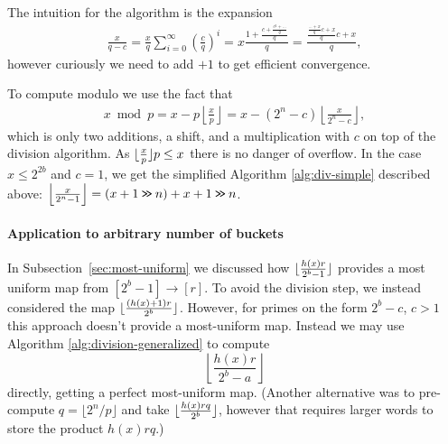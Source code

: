 The intuition for the algorithm is the expansion
\begin{align}
   \frac{x}{q-c}
   = \frac{x}{q}\sum_{i=0}^\infty \left(\frac{c}{q}\right)^i
   = x\frac{1+\frac{c+\frac{c^2 + \dots}{q}}{q}}{q}
   = \frac{\frac{\frac{\dots+x}{q}c+x}{q}c+x}{q},
\end{align}
however curiously we need to add $+1$ to get efficient convergence.









To compute modulo we use the fact that
\begin{align}
   x \bmod p
   = x - p\left\lfloor\frac{x}{p}\right\rfloor
   = x - (2^n - c)\left\lfloor\frac{x}{2^n-c}\right\rfloor,
\end{align}
which is only two additions, a shift, and a multiplication with $c$ on top of the division algorithm.
As $\lfloor {\frac{x}{p}} \rfloor p \le x$ there is no danger of overflow.
In the case $x\le 2^{2b}$ and $c=1$, we get the simplified Algorithm \ref{alg:div-simple} described above: $ \left\lfloor\frac{x}{2^n-1}\right\rfloor = (x+1 \mathbin{\texttt{>\!>}} n)+x+1 \mathbin{\texttt{>\!>}} n$.


\paragraph{Application to arbitrary number of buckets}
In Subsection~\ref{sec:most-uniform} we discussed how $\lfloor {\frac{h(x)r}{2^b-1}} \rfloor$ provides a most uniform map from $[2^b-1]\to[r]$.
To avoid the division step, we instead considered the map
$\lfloor {\frac{(h(x)+1)r}{2^b}} \rfloor$.
However, for primes on the form $2^b-c$, $c>1$ this approach doesn't provide a most-uniform map.
%
Instead we may use Algorithm \ref{alg:division-generalized} to compute
$$\left\lfloor\frac{h(x)r}{2^b-a}\right\rfloor$$
directly, getting a perfect most-uniform map.
(Another alternative was to pre-compute $q = \lfloor2^n/p\rfloor$ and take
$\lfloor {\frac{h(x)rq}{2^b}} \rfloor$, however that requires larger words to store the product $h(x)rq$.)

